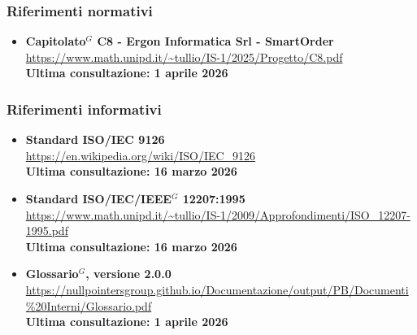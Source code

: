 	\subsubsection{Riferimenti normativi}

	\begin{itemize}[itemsep=5pt, parsep=5pt, label=$\scriptstyle\bullet$]

    \item \textbf{Capitolato$^G$ C8 - Ergon Informatica Srl - SmartOrder}\\
    \url{https://www.math.unipd.it/~tullio/IS-1/2025/Progetto/C8.pdf}\\[3pt]
    \textbf{Ultima consultazione: 1 aprile 2026}

	\end{itemize}

	\subsubsection{Riferimenti informativi}
	\begin{itemize}[itemsep=5pt, parsep=5pt, label=$\scriptstyle\bullet$]

    \item \textbf{Standard ISO/IEC 9126}\\
     \url{https://en.wikipedia.org/wiki/ISO/IEC\_9126}\\[3pt]
    \textbf{Ultima consultazione: 16 marzo 2026}

    \item \textbf{Standard ISO/IEC/IEEE$^G$ 12207:1995}\\
     \url{https://www.math.unipd.it/~tullio/IS-1/2009/Approfondimenti/ISO_12207-1995.pdf}\\[3pt]
    \textbf{Ultima consultazione: 16 marzo 2026}

	\item \textbf{Glossario$^G$, versione 2.0.0}\\
     \url{https://nullpointersgroup.github.io/Documentazione/output/PB/Documenti%20Interni/Glossario.pdf}\\[3pt]
    \textbf{Ultima consultazione: 1 aprile 2026}

	\end{itemize}
